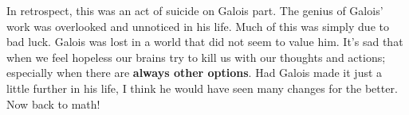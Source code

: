\documentclass{ximera}
\begin{document}
In retrospect, this was an act of suicide on Galois part. The genius
of Galois' work was overlooked and unnoticed in his life.  Much of this
was simply due to bad luck. Galois was lost in a world that did not
seem to value him.  It's sad that when we feel hopeless our brains try
to kill us with our thoughts and actions; especially when there are
\textbf{always other options}. Had Galois
made it just a little further in his life, I think he would have seen
many changes for the better. Now back to math!




\end{document}
